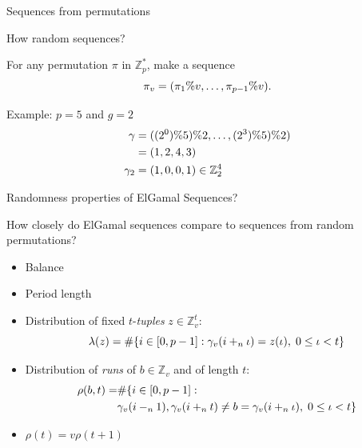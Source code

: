 \begin{frame}{Sequences from permutations}
    \begin{center}
        {\Large
            How random sequences?
        }
    \end{center}
    
    \pause
    For any  permutation $\pi$ in $\mathbb{Z}_p^*$, make a sequence
    \[
        \pi_v = (\pi_1 \% v, \ldots, \pi_{p-1}\% v).
    \]
    
    \pause

    Example:  $p=5$ and $g=2$
    \begin{align*}            \gamma &= ( (2^0) \% 5) \% 2, \ldots, (2^3) \% 5) \% 2)\\
      &= (1, 2, 4, 3) \\
        \gamma_2 &= (1, 0, 0, 1) \in \mathbb{Z}_2^4
    \end{align*}
\end{frame}


\begin{frame}{Randomness properties of ElGamal Sequences?}
    
    \begin{center}
        How closely do ElGamal sequences compare to sequences from random permutations?
    \end{center}
    
    \begin{itemize}
        \item Balance
        \item Period length
        \item Distribution of fixed $t$-\emph{tuples} $z\in\mathbb{Z}_v^t$:
        $$\lambda(z) = \#{\{i \in [0,p-1]: \gamma_v(i+_{n} \iota) = z(\iota),\; 0 \leq \iota < t\}}$$
        \item  Distribution of \emph{runs} of $b\in\mathbb{Z}_v$ and of length $t$:
        \begin{align*}
            \rho(b,t) = & \#{ \{i \in [0,p-1]: }\\
                        &\gamma_v(i-_{n} 1),\gamma_v(i+_n t) \neq b = \gamma_v(i+_n\iota),\; 0 \leq \iota < t\}
        \end{align*}
        \item $\rho(t) = v \rho(t+1)$
    \end{itemize}
  
  \end{frame}


